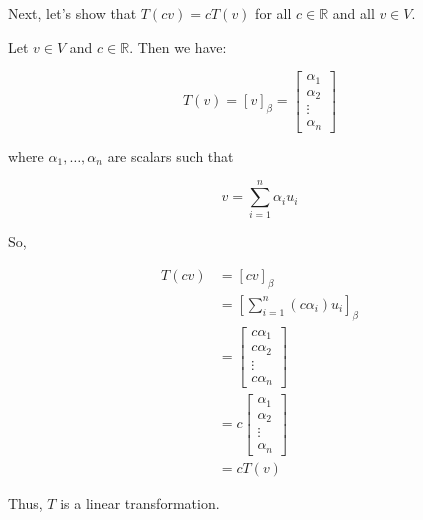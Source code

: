 \documentclass{report}
\begin{document}
\begin{Example}
        Next, let's show that $T(cv) = cT(v)$ for all $c \in \mathbb{R}$ and all $v \in V$.

        Let $v \in V$ and $c \in \mathbb{R}$. Then we have:

        $$T(v) = [v]_\beta = \begin{bmatrix}
            \alpha_1\\ \alpha_2\\ \vdots \\ \alpha_n
        \end{bmatrix}$$

        where $\alpha_1,\dots, \alpha_n$ are scalars such that

        $$v = \sum_{i=1}^{n} \alpha_i u_i$$

        So,

        \begin{align*}
        T(cv) &= [cv]_\beta \\
        &= \left[\sum_{i=1}^{n} (c\alpha_i) u_i\right]_\beta \\
        &= \begin{bmatrix}
            c\alpha_1\\ c\alpha_2\\ \vdots \\ c\alpha_n
        \end{bmatrix} \\
        &= c\begin{bmatrix}
            \alpha_1\\ \alpha_2\\ \vdots \\ \alpha_n
        \end{bmatrix} \\
        &= cT(v)
        \end{align*}

        Thus, $T$ is a linear transformation.

    \end{Example}
\end{document}
